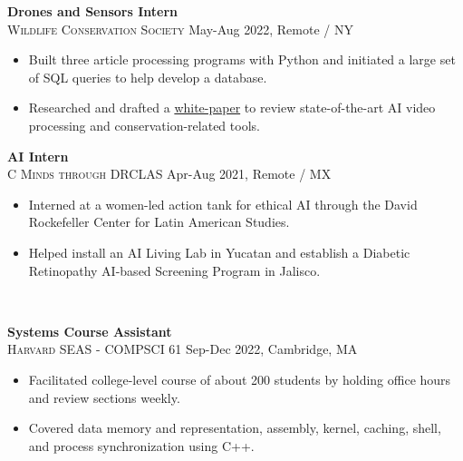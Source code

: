 \documentclass[11pt]{article}
\begin{document}
    \noindent \textbf{Drones and Sensors Intern}\\
    \textsc{{Wildlife Conservation Society}} \hfill May-Aug 2022, Remote / NY
    \begin{itemize}[itemsep=-.4em, leftmargin=1em]\vspace{-2mm}
      \item Built three article processing programs with Python and initiated a large set of SQL queries to help develop a database.
      \item Researched and drafted a 
      \href{https://bit.ly/AI-Advancing-Video-Processing-and-CTDS}{white-paper} to review state-of-the-art AI video processing and conservation-related tools.
    \end{itemize}

    \noindent \textbf{AI Intern}\\
    \textsc{{C Minds through DRCLAS}} \hfill Apr-Aug 2021, Remote / MX
    \begin{itemize}[itemsep=-.4em, leftmargin=1em]\vspace{-2mm}
      \item Interned at a women-led action tank for ethical AI through the David Rockefeller Center for Latin American Studies.
      \item Helped install an AI Living Lab in Yucatan and establish a Diabetic Retinopathy AI-based Screening Program in Jalisco. 
    \end{itemize}

  \vspace{-7pt}\\
  \noindent\makebox[\linewidth]{\rule{7.5in}{0.3pt}}


  \noindent\textbf{Systems Course Assistant}  \\
  \textsc{Harvard SEAS - COMPSCI 61} \hfill Sep-Dec 2022, Cambridge, MA
  \begin{itemize}[itemsep=-.4em, leftmargin=1em]\vspace{-2mm}
    \item Facilitated college-level course of about 200 students by holding office hours and review sections weekly.
    \item Covered data memory and representation, assembly, kernel, caching, shell, and process synchronization using C++.
  \end{itemize}
\end{document}
